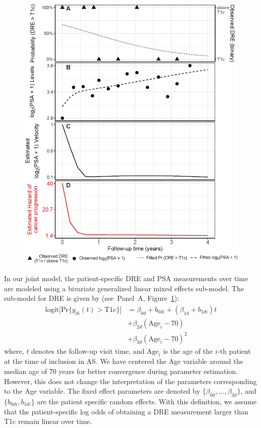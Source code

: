 \documentclass[a4paper, 12pt]{article}
\begin{document}
\begin{figure}[!htb]
\captionsetup{justification=justified}
\centerline{\includegraphics[width=\columnwidth]{Figure3.eps}}

\label{Figure3}
\end{figure}

In our joint model, the patient-specific DRE and PSA measurements over time are modeled using a bivariate generalized linear mixed effects sub-model. The sub-model for DRE is given by (see~Panel~A, Figure~\ref{Figure3}):
\begin{equation}
\label{eq:long_model_dre}
\begin{split}
    \mbox{logit} \big[\mbox{Pr}\{y_{di}(t) > \mbox{T1c}\}\big] &= \beta_{0d} + b_{0di} + (\beta_{1d} + b_{1di}) t\\
    &+ \beta_{2d} (\mbox{Age}_i-70)\\ & + \beta_{3d} (\mbox{Age}_i-70)^2
    \end{split}
\end{equation}
where, $t$ denotes the follow-up visit time, and $\mbox{Age}_i$ is the age of the ${i\mbox{-th}}$ patient at the time of inclusion in AS. We have centered the Age variable around the median age of 70 years for better convergence during parameter estimation. However, this does not change the interpretation of the parameters corresponding to the Age variable. The fixed effect parameters are denoted by ${\{\beta_{0d}, \ldots, \beta_{3d}\}}$, and ${\{b_{0di}, b_{1di}\}}$ are the patient specific random effects. With this definition, we assume that the patient-specific log odds of obtaining a DRE measurement larger than T1c remain linear over time. 
\end{document}

